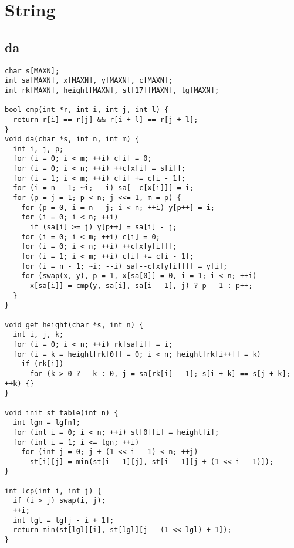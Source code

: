 \documentclass[twoside]{article}
\begin{document}
\section{String}

\subsection{da}
\begin{lstlisting}
char s[MAXN];
int sa[MAXN], x[MAXN], y[MAXN], c[MAXN];
int rk[MAXN], height[MAXN], st[17][MAXN], lg[MAXN];

bool cmp(int *r, int i, int j, int l) {
  return r[i] == r[j] && r[i + l] == r[j + l];
}
void da(char *s, int n, int m) {
  int i, j, p;
  for (i = 0; i < m; ++i) c[i] = 0;
  for (i = 0; i < n; ++i) ++c[x[i] = s[i]];
  for (i = 1; i < m; ++i) c[i] += c[i - 1];
  for (i = n - 1; ~i; --i) sa[--c[x[i]]] = i;
  for (p = j = 1; p < n; j <<= 1, m = p) {
    for (p = 0, i = n - j; i < n; ++i) y[p++] = i;
    for (i = 0; i < n; ++i)
      if (sa[i] >= j) y[p++] = sa[i] - j;
    for (i = 0; i < m; ++i) c[i] = 0;
    for (i = 0; i < n; ++i) ++c[x[y[i]]];
    for (i = 1; i < m; ++i) c[i] += c[i - 1];
    for (i = n - 1; ~i; --i) sa[--c[x[y[i]]]] = y[i];
    for (swap(x, y), p = 1, x[sa[0]] = 0, i = 1; i < n; ++i)
      x[sa[i]] = cmp(y, sa[i], sa[i - 1], j) ? p - 1 : p++;
  }
}

void get_height(char *s, int n) {
  int i, j, k;
  for (i = 0; i < n; ++i) rk[sa[i]] = i;
  for (i = k = height[rk[0]] = 0; i < n; height[rk[i++]] = k)
    if (rk[i])
      for (k > 0 ? --k : 0, j = sa[rk[i] - 1]; s[i + k] == s[j + k]; ++k) {}
}

void init_st_table(int n) {
  int lgn = lg[n];
  for (int i = 0; i < n; ++i) st[0][i] = height[i];
  for (int i = 1; i <= lgn; ++i)
    for (int j = 0; j + (1 << i - 1) < n; ++j)
      st[i][j] = min(st[i - 1][j], st[i - 1][j + (1 << i - 1)]);
}

int lcp(int i, int j) {
  if (i > j) swap(i, j);
  ++i;
  int lgl = lg[j - i + 1];
  return min(st[lgl][i], st[lgl][j - (1 << lgl) + 1]);
}

\end{lstlisting}
\end{document}

